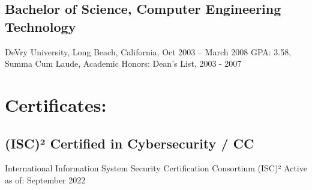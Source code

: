 \documentclass[letter,10pt]{article}
\begin{document}
\subsection*{Bachelor of Science, Computer Engineering Technology}
\label{sec:orge51ea4d}
DeVry University, Long Beach, California, Oct 2003 – March 2008
GPA: 3.58, Summa Cum Laude, Academic Honors: Dean’s List, 2003 - 2007

\section*{Certificates:}
\label{sec:org641e862}
\subsection*{(ISC)² Certified in Cybersecurity / CC}
\label{sec:org63cc03a}
International Information System Security Certification Consortium (ISC)²
Active as of: September 2022
\end{document}
